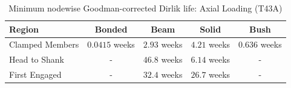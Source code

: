 \begin{table}[H]
    \centering
    \caption{Minimum nodewise Goodman-corrected Dirlik life: Axial Loading (T43A)}
    \label{tab:MinLife_axial_t43a_nodewise_weeks}
    \begin{tabular}{lcccc}
        \toprule
        Region & Bonded & Beam & Solid & Bush \\
        \midrule
        Clamped Members & $0.0415$ weeks & $2.93$ weeks & $4.21$ weeks & $0.636$ weeks \\
        Head to Shank & - & $46.8$ weeks & $6.14$ weeks & - \\
        First Engaged & - & $32.4$ weeks & $26.7$ weeks & - \\
        \bottomrule
    \end{tabular}
\end{table}
